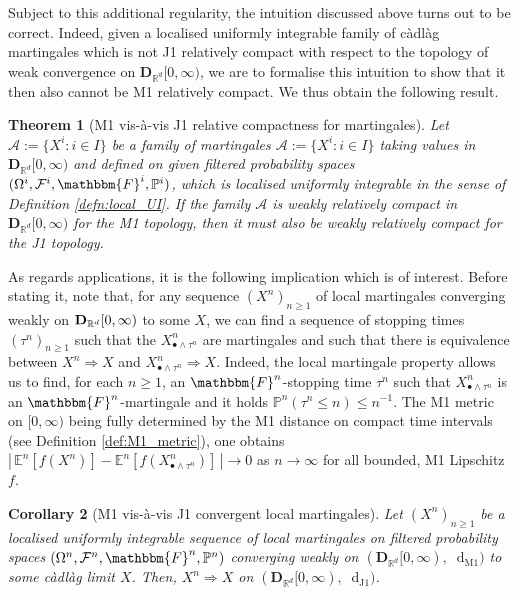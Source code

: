 \documentclass[11pt]{article}
\newtheorem{theorem}{Theorem}[section]
\newtheorem{cor}[theorem]{Corollary}
\theoremstyle{definition}\newtheorem{example}[theorem]{Example}
\theoremstyle{definition}\newtheorem{counterexample}[theorem]{Counterexample}
\theoremstyle{definition}\newtheorem{remark}[theorem]{Remark}
\theoremstyle{definition}\newtheorem{defi}[theorem]{Definition}
\numberwithin{equation}{section}
\newcommand{\R}{\mathbb{R}}
\newcommand{\D}{{\bf D}}											%
\newcommand*\diff{\mathop{}\!\mathrm{d}}								%
\newcommand{\E}{\mathbb{E}}											%
\newcommand{\Pro}{\mathbb{P}}										%
\renewcommand{\|}{\; : \, \;}											%
\newcommand{\dJ}{\diff_{\operatorname{J1}}}								%
\newcommand{\dM}{\diff_{\operatorname{M1}}}							%
\begin{document}
Subject to this additional regularity, the intuition discussed above turns out to be correct. Indeed, given a localised uniformly integrable family of càdlàg martingales which is not J1 relatively compact with respect to the topology of weak convergence on $\mathbf{D}_{\mathbb{R}^d}[0,\infty)$, we are to formalise this intuition to show that it then also cannot be M1 relatively compact. We thus obtain the following result.

\begin{theorem}[M1 vis-à-vis J1 relative compactness for martingales] \label{cor:3.11} 
	Let $\mathcal{A}:=\{X^i :  i \in I\}$ be a family of martingales $\mathcal{A}:=\{X^i :  i \in I\}$ taking values in $\mathbf{D}_{\mathbb{R}^d}[0,\infty)$ and defined on given filtered probability spaces $(\Omega^i, \mathcal{F}^i, \mathbbm{F}^i, \Pro^i)$, which is localised uniformly integrable in the sense of Definition \ref{defn:local_UI}. If the family $\mathcal{A}$ is weakly relatively compact in $\mathbf{D}_{\mathbb{R}^d}[0,\infty)$ for the M1 topology, then it must also be weakly relatively compact for the J1 topology.
\end{theorem}

As regards applications, it is the following implication which is of interest. Before stating it, note that, for any sequence $(X^n)_{n\ge 1}$ of local martingales converging weakly on $\D_{\R^d}[0,\infty)$ to some $X$, we can find a sequence of stopping times $(\tau^n)_{n\ge 1}$ such that the $X^n_{\bullet \wedge \tau^n}$ are martingales and such that there is equivalence between $X^n \Rightarrow X$ and $X^n_{\bullet \wedge \tau^n} \Rightarrow X$. Indeed, the local martingale property allows us to find, for each $n\ge 1$, an $\mathbbm{F}^n$-stopping time $\tau^n$ such that $X^n_{\bullet \wedge \tau^n}$ is an $\mathbbm{F}^n$-martingale and it holds $\Pro^n(\tau^n \le n) \le n^{-1}$. The M1 metric on $[0,\infty)$ being fully determined by the M1 distance on compact time intervals (see Definition \ref{def:M1_metric}), one obtains $|\,\E^n[f(X^n)]-\E^n[f(X^n_{\bullet \wedge \tau^n})]\,| \to 0$ as $n\to \infty$ for all bounded, M1 Lipschitz $f$.

\begin{cor}[M1 vis-\`a-vis J1 convergent local martingales] \label{cor:M1_conv_impl_J1_conv_martingales}
	Let $(X^n)_{n\ge 1}$ be a localised uniformly integrable sequence of local martingales on filtered probability spaces $(\Omega^n, \mathcal{F}^n, \mathbbm{F}^n, \Pro^n)$ converging weakly on $(\mathbf{D}_{\mathbb{R}^d}[0,\infty), \dM)$ to some càdlàg limit $X$. Then, $X^n \Rightarrow X$ on $(\mathbf{D}_{\mathbb{R}^d}[0,\infty), \dJ)$.
\end{cor}
\end{document}
